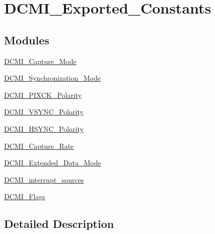 \hypertarget{group___d_c_m_i___exported___constants}{\section{D\-C\-M\-I\-\_\-\-Exported\-\_\-\-Constants}
\label{group___d_c_m_i___exported___constants}
}
\subsection*{Modules}
\begin{DoxyCompactItemize}
\item 
\hyperlink{group___d_c_m_i___capture___mode}{D\-C\-M\-I\-\_\-\-Capture\-\_\-\-Mode}
\item 
\hyperlink{group___d_c_m_i___synchronization___mode}{D\-C\-M\-I\-\_\-\-Synchronization\-\_\-\-Mode}
\item 
\hyperlink{group___d_c_m_i___p_i_x_c_k___polarity}{D\-C\-M\-I\-\_\-\-P\-I\-X\-C\-K\-\_\-\-Polarity}
\item 
\hyperlink{group___d_c_m_i___v_s_y_n_c___polarity}{D\-C\-M\-I\-\_\-\-V\-S\-Y\-N\-C\-\_\-\-Polarity}
\item 
\hyperlink{group___d_c_m_i___h_s_y_n_c___polarity}{D\-C\-M\-I\-\_\-\-H\-S\-Y\-N\-C\-\_\-\-Polarity}
\item 
\hyperlink{group___d_c_m_i___capture___rate}{D\-C\-M\-I\-\_\-\-Capture\-\_\-\-Rate}
\item 
\hyperlink{group___d_c_m_i___extended___data___mode}{D\-C\-M\-I\-\_\-\-Extended\-\_\-\-Data\-\_\-\-Mode}
\item 
\hyperlink{group___d_c_m_i__interrupt__sources}{D\-C\-M\-I\-\_\-interrupt\-\_\-sources}
\item 
\hyperlink{group___d_c_m_i___flags}{D\-C\-M\-I\-\_\-\-Flags}
\end{DoxyCompactItemize}


\subsection{Detailed Description}

